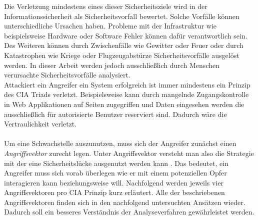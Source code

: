 \documentclass[
    12pt, %
    DIV10,
    ngerman, %
    a4paper, %
    oneside, %
    titlepage, %
    parskip=half, %
    headings=normal, %
    listof=totoc, %
    bibliography=totoc, %
    index=totoc, %
    captions=tableheading, %
    final %
]{scrreprt}
\begin{document}
Die Verletzung mindestens eines dieser Sicherheitsziele wird in der Informationssicherheit als Sicherheitsvorfall bewertet. 
Solche Vorfälle können unterschiedliche Ursachen haben. Probleme mit der Infrastruktur wie beispielsweise Hardware oder Software Fehler können dafür verantwortlich sein. Des Weiteren können durch Zwischenfälle wie Gewitter oder Feuer oder durch Katastrophen wie Kriege oder Flugzeugabstürze Sicherheitsvorfälle ausgelöst werden. In dieser Arbeit werden jedoch ausschließlich durch Menschen verursachte Sicherheitsvorfälle analysiert.\\
Attackiert ein Angreifer ein System erfolgreich ist immer mindestens ein Prinzip des CIA Triads verletzt.
Beispielsweise kann durch mangelnde Zugangskontrolle in Web Applikationen auf Seiten zugegriffen und Daten eingesehen werden die ausschließlich für autorisierte Benutzer reserviert sind. Dadurch wäre die Vertraulichkeit verletzt.\\\\
Um eine Schwachstelle auszunutzen, muss sich der Angreifer zunächst einen \emph{Angriffsvektor} zurecht legen. Unter Angriffsvektor versteht man also die Strategie mit der eine Sicherheitslücke ausgenutzt werden kann \parencite{rahalkar2018network}. Das bedeutet, ein Angreifer muss sich vorab überlegen wie er mit einem potenziellen Opfer interagieren kann beziehungsweise will. 
Nachfolgend werden jeweils vier Angriffsvektoren pro CIA Prinzip kurz erläutert. Alle der beschriebenen Angriffsvektoren finden sich in den nachfolgend untersuchten Ansätzen wieder. Dadurch soll ein besseres Verständnis der Analyseverfahren gewährleistet werden.
\end{document}

